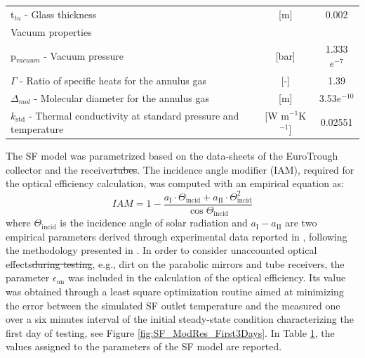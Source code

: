 \documentclass[final,3p,times,review]{elsarticle}
\providecommand{\DIFdel}[1]{{\protect\color{red}\sout{#1}}}                      %
\providecommand{\DIFdelbegin}{} %
\providecommand{\DIFdelend}{} %
\begin{document}
\begin{table}[h!]
\begin{tabularx}{\textwidth}{Xcc}
		\hspace*{0.3cm} t$_{tu}$ - Glass thickness  & [m] & 0.002\\
		Vacuum properties &  &  \\
		\hspace*{0.3cm} p$_{vacuum}$ - Vacuum pressure & [bar] & 1.333$e^{-7}$\\
		\hspace*{0.3cm} $\Gamma$ - Ratio of specific heats for the annulus gas & [-] & 1.39\\
		\hspace*{0.3cm} $\Delta_{mol}$ - Molecular diameter for the annulus gas & [m] & 3.53$e^{-10}$\\
		\hspace*{0.3cm} $k_\mathrm{std}$ - Thermal conductivity at standard pressure and temperature & [W m$^{-1}$K$^{-1}$] & 0.02551\\
		\bottomrule
	\end{tabularx}%
	\label{tab:SF_parameter}%
\end{table}%
%
The SF model was parametrized based on the data-sheets of the EuroTrough collector and the receiver\DIFdelbegin \DIFdel{tubes}\DIFdelend . The incidence angle modifier (IAM), required for the optical efficiency calculation, was computed with an empirical equation as:
%
\begin{equation}
IAM = 1 - \frac{a_\mathrm{I} \cdot \Theta_\mathrm{incid} + a_\mathrm{II}\cdot \Theta_\mathrm{incid}^2}{\cos{\Theta_\mathrm{incid}}}
\end{equation} 
%
where $\Theta_\mathrm{incid}$ is the incidence angle of solar radiation and $a_\mathrm{I}-a_\mathrm{II}$ are two empirical parameters derived through experimental data reported in \cite{Sallaberry2016}, following the methodology presented in \cite{Valenzuela2014}. In order to consider unaccounted optical effects\DIFdelbegin \DIFdel{during testing}\DIFdelend , e.g., dirt on the parabolic mirrors and tube receivers, the parameter $\epsilon_\mathrm{un}$ was included in the calculation of the optical efficiency. Its value was obtained through a least square optimization routine aimed at minimizing the error between the simulated SF outlet temperature and the measured one over a six minutes interval  of the initial steady-state condition characterizing the first day of testing, see Figure \ref{fig:SF_ModRes_First3Days}. In Table \ref{tab:SF_parameter}, the values assigned to the parameters of the SF model are reported.
%
\end{document}
